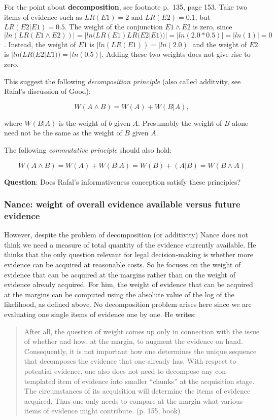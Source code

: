 \documentclass[
  10pt,
  dvipsnames,enabledeprecatedfontcommands]{scrartcl}
\begin{document}
For the point about \textbf{decomposition}, see footnote p.~135, page
153. Take two items of evidence such as \(LR(E1)=2\) and \(LR(E2)=0.1\),
but \(LR(E2 | E1)=0.5\). The weight of the conjunction \(E1 \wedge E2\)
is zero, since
\(|ln(LR(E1 \wedge E2))|=|ln(LR(E1)LR(E2| E1))|=|ln(2.0*0.5)|=|ln(1)|=0\).
Instead, the weight of \(E1\) is \(|ln(LR(E1))=|ln(2.0)|\) and the
weight of \(E2\) is \(|ln(LR(E2|E1))=|ln(0.5)|\). Adding these two
weights does not give rise to zero.

This suggest the following \textit{decomposition principle} (also called
additvity, see Rafal's discussion of Good):

\[W(A \wedge B) = W(A) + W(B | A),\]

where \(W(B | A)\) is the weight of \(b\) given \(A\). Presumably the
weight of \(B\) alone need not be the same as the weight of \(B\) given
\(A\).

The following \textit{commutative principle} should also hold:

\[W(A \wedge B) = W(A) + W(B | A)= W(B) + (A | B) = W(B \wedge A)\]

\textbf{Question}: Does Rafal's informativeness conception satisfy these
principles?

\hypertarget{nance-weight-of-overall-evidence-available-versus-future-evidence}{%
\subsubsection{Nance: weight of overall evidence available versus future
evidence}\label{nance-weight-of-overall-evidence-available-versus-future-evidence}}

However, despite the problem of decomposition (or additivity) Nance does
not think we need a measure of total quantity of the evidence currently
available. He thinks that the only question relevant for legal
decision-making is whether more evidence can be acquired at reasonable
costs. So he focuses on the weight of evidence that can be acquired at
the margins rather than on the weight of evidence already acquired. For
him, the weight of evidence that can be acquired at the margins can be
computed using the absolute value of the log of the likelihood, as
defined above. No decomposition problem arises here since we are
evaluating one single items of evidence one by one. He writes:

\begin{quote}
After all, the question of weight comes up only in connection with the issue of whether and how, at the margin, to augment the evidence on hand. Consequently, it is not important how one determines the unique sequence that decomposes the evidence that one already has. With respect to potential evidence, one also does not need to decompose any con- templated item of evidence into smaller “chunks” at the acquisition stage. The circumstances of its acquisition will determine the items of evidence acquired. Thus one only needs to compare at the margin what various items of evidence might contribute. (p. 155, book)
\end{quote}
\end{document}
